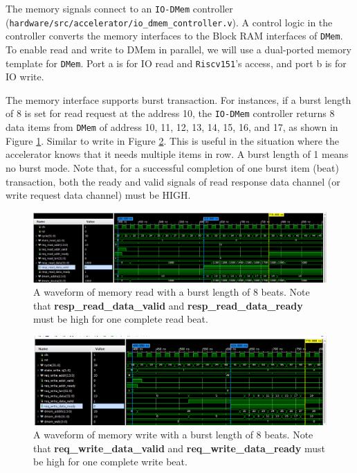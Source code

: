 \documentclass[11pt]{article}
\begin{document}
The memory signals connect to an \texttt{IO-DMem} controller (\verb|hardware/src/accelerator/io_dmem_controller.v|). A control logic in the controller converts the memory interfaces to the Block RAM interfaces of \texttt{DMem}. To enable read and write to DMem in parallel, we will use a dual-ported memory template for \texttt{DMem}. Port a is for IO read and \texttt{Riscv151}'s access, and port b is for IO write.

The memory interface supports burst transaction. For instances, if a burst length of 8 is set for read request at the address 10, the \texttt{IO-DMem} controller returns 8 data items from \texttt{DMem} of address 10, 11, 12, 13, 14, 15, 16, and 17, as shown in Figure \ref{fig:read_burst8}. Similar to write in Figure \ref{fig:write_burst8}. This is useful in the situation where the accelerator knows that it needs multiple items in row. A burst length of 1 means no burst mode. Note that, for a successful completion of one burst item (beat) transaction, both the ready and valid signals of read response data channel (or write request data channel) must be HIGH.

\begin{figure}[hbt]
\begin{center}
  \includegraphics[width=1.0\textwidth]{read_burst8.png}
  \caption{A waveform of memory read with a burst length of 8 beats. Note that \textbf{resp\_read\_data\_valid} and \textbf{resp\_read\_data\_ready} must be high for one complete read beat.}
  \label{fig:read_burst8}
\end{center}
\end{figure}

\begin{figure}[hbt]
\begin{center}
  \includegraphics[width=1.0\textwidth]{write_burst8.png}
  \caption{A waveform of memory write with a burst length of 8 beats. Note that \textbf{req\_write\_data\_valid} and \textbf{req\_write\_data\_ready} must be high for one complete write beat.}
  \label{fig:write_burst8}
\end{center}
\end{figure}
\end{document}
